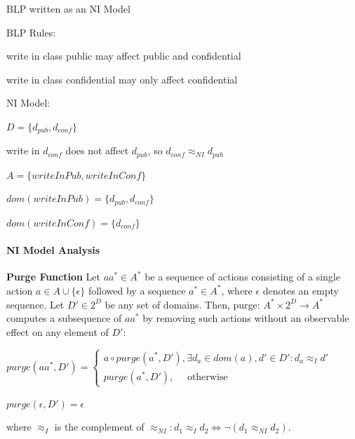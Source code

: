 \documentclass[a4paper]{article}
\renewcommand{\note}[2]{\begin{noteBox} \textbf{#1} #2 \end{noteBox}}
\begin{document}
\begin{multicols}{3}
    BLP written as an NI Model
    \begin{itemize*}
        \item BLP Rules:
        \begin{itemize*}
            \item write in class public may affect public and confidential
            \item write in class confidential may only affect confidential
        \end{itemize*}
        \item NI Model:
        \begin{itemize*}
            \item $D=\{d_{pub},d_{conf}\}$
            \item write in $d_{conf}$ does not affect $d_{pub}$, so $d_{conf} \approx_{NI} d_{pub}$
            \item $A=\{writeInPub, writeInConf\}$
            \item $dom(writeInPub)=\{d_{pub},d_{conf}\}$
            \item $dom(writeInConf)=\{d_{conf}\}$
        \end{itemize*}
    \end{itemize*}

    \paragraph{NI Model Analysis}

    \note{Purge Function}{Let $aa^*\in A^*$ be a sequence of actions consisting of a single action $a\in A\cup\{\epsilon\}$ followed by a sequence $a^*\in A^*$, where $\epsilon$ denotes an empty sequence. Let $D'\in 2^D$ be any set of domains. Then, purge: $A^*\times 2^D \rightarrow A^*$ computes a subsequence of $aa^*$ by removing such actions without an observable effect on any element of $D':$
        \begin{itemize*}
            \item $purge(aa^*,D')=\begin{cases} a\circ purge(a^*,D'), \exists d_a\in dom(a),d'\in D':d_a\approx_I d' \\ purge(a^*,D'), \quad\text{ otherwise }\end{cases}$
            \item $purge(\epsilon,D')=\epsilon$
        \end{itemize*}
        where $\approx_I$ is the complement of $\approx_{NI}:d_1 \approx_I d_2\Leftrightarrow \lnot(d_1 \approx_{NI} d_2)$.
    }


\end{multicols}
\end{document}

